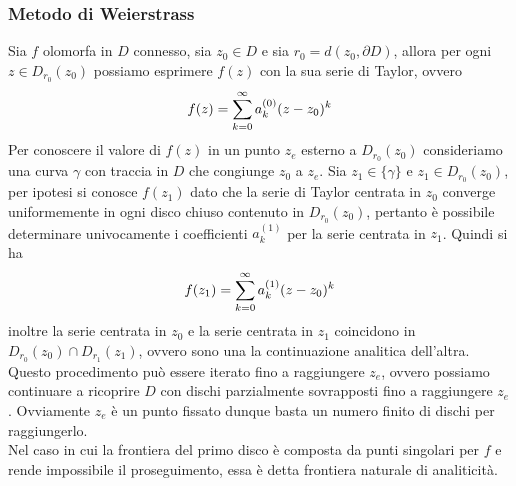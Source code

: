 \documentclass{article}
\begin{document}
\subsubsection{Metodo di Weierstrass}
Sia $f$ olomorfa in $D$ connesso, sia $z_0 \in D$ e sia $r_0 = d(z_0, \partial D)$, allora per ogni $z \in D_{r_0}(z_0)$ possiamo esprimere $f(z)$ con la sua serie di Taylor, ovvero
\begin{gather}
    f(z) = \sum_{k = 0}^\infty a^{(0)}_k(z - z_0)^k \notag
\end{gather}
Per conoscere il valore di $f(z)$ in un punto $z_e$ esterno a $D_{r_0}(z_0)$ consideriamo una curva $\gamma$ con traccia in $D$ che congiunge $z_0$ a $z_e$. Sia $z_1 \in \{\gamma\}$ e $z_1 \in D_{r_0}(z_0)$, per ipotesi si conosce $f(z_1)$ dato che la serie di Taylor centrata in $z_0$ converge uniformemente in ogni disco chiuso contenuto in $D_{r_0}(z_0)$, pertanto è possibile determinare univocamente i coefficienti $a^{(1)}_k$ per la serie centrata in $z_1$. Quindi si ha
\begin{gather}
    f(z_1) = \sum_{k = 0}^\infty a^{(1)}_k(z - z_0)^k \notag
\end{gather}
inoltre la serie centrata in $z_0$ e la serie centrata in $z_1$ coincidono in $D_{r_0}(z_0) \cap D_{r_1}(z_1)$, ovvero sono una la continuazione analitica dell'altra. Questo procedimento può essere iterato fino a raggiungere $z_e$, ovvero possiamo continuare a ricoprire $D$ con dischi parzialmente sovrapposti fino a raggiungere $z_e$. Ovviamente $z_e$ è un punto fissato dunque basta un numero finito di dischi per raggiungerlo. \\
Nel caso in cui la frontiera del primo disco è composta da punti singolari per $f$ e rende impossibile il proseguimento, essa è detta frontiera naturale di analiticità.
\end{document}

